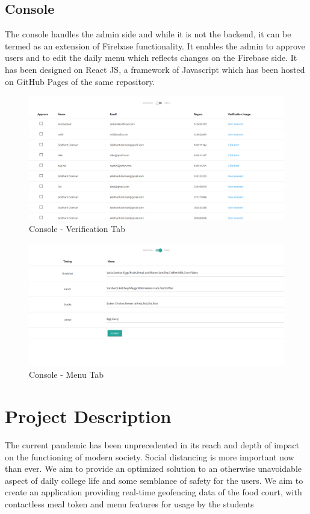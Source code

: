 \documentclass[12pt]{article}
\begin{document}
\subsection*{Console}
{\justify
The console handles the admin side and while it is not the backend, it can be termed as an extension of Firebase functionality. It enables the admin to approve users and to edit the daily menu which reflects changes on the Firebase side. It has been designed on React JS, a framework of Javascript which has been hosted on GitHub Pages of the same repository.
}
\begin{figure}[H]
    \centering
    \includegraphics[width=0.7\linewidth]{verify.png}
    \caption{Console - Verification Tab}
\end{figure}
\begin{figure}[H]
    \centering
    \includegraphics[width=0.7\linewidth]{food.png}
    \caption{Console - Menu Tab}
\end{figure}
\newpage

\section*{\LARGE{Project Description}}
{\justify
The current pandemic has been unprecedented in its reach and depth of impact on the functioning of 
modern society. Social distancing is more important now than ever. We aim to provide an optimized 
solution to an otherwise unavoidable aspect of daily college life and some semblance of safety for the 
users. We aim to create an application providing real-time geofencing data of the food court, with contactless meal token
and menu features for usage by the students
}
\end{document}
